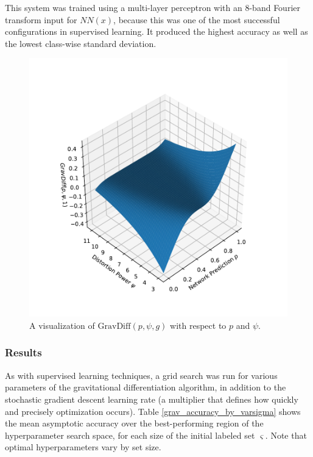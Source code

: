 \documentclass[10pt]{article}
\begin{document}
This system was trained using a multi-layer perceptron with an 8-band Fourier transform input for $NN(x)$, because this was one of the most successful configurations in supervised learning. It produced the highest accuracy as well as the lowest class-wise standard deviation.

\begin{figure}[h!]
    \centering
    \includegraphics[width=\textwidth]{grav_diff}
    \caption{\label{grav_diff} A visualization of $\mathrm{GravDiff}(p, \psi, g)$ with respect to $p$ and $\psi$.}
\end{figure}

\subsubsection{Results}

As with supervised learning techniques, a grid search was run for various parameters of the gravitational differentiation algorithm, in addition to the stochastic gradient descent learning rate (a multiplier that defines how quickly and precisely optimization occurs). Table \ref{grav_accuracy_by_varsigma} shows the mean asymptotic accuracy over the best-performing region of the hyperparameter search space, for each size of the initial labeled set $\varsigma$. Note that optimal hyperparameters vary by set size.
\end{document}
